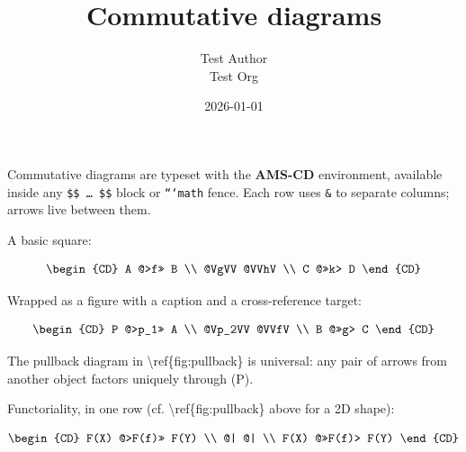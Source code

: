 \documentclass[11pt,a4paper]{article}
\title{Commutative diagrams}
\author{Test Author \\ Test Org}
\date{2026-01-01}
\theoremstyle{definition}
\begin{document}
\maketitle

Commutative diagrams are typeset with the \textbf{AMS-CD} environment,
available inside any \texttt{\$\$ … \$\$} block or \texttt{```math} fence. Each
row uses \texttt{\&} to separate columns; arrows live between them.


A basic square:


\[
\begin{CD}
  A  @>f>>  B \\
  @VgVV    @VVhV \\
  C  @>>k>  D
\end{CD}
\]


Wrapped as a figure with a caption and a cross-reference target:


\[
\begin{CD}
  P  @>p_1>>  A \\
  @Vp_2VV    @VVfV \\
  B  @>>g>    C
\end{CD}
\]


The pullback diagram in \textbackslash{}ref\{fig:pullback\} is universal: any pair
of arrows from another object factors uniquely through (P).


Functoriality, in one row (cf. \textbackslash{}ref\{fig:pullback\} above for a 2D
shape):


\[
\begin{CD}
  F(X)  @>F(f)>>  F(Y) \\
  @|              @| \\
  F(X)  @>>F(f)>  F(Y)
\end{CD}
\]
\end{document}
